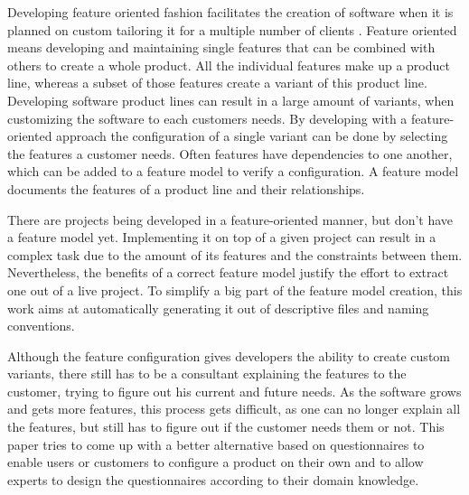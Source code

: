 % 
% 
% 
% 
Developing feature oriented fashion facilitates the creation of software when it is planned on custom tailoring it for a multiple number of clients \cite{spl-pp}. Feature oriented means developing and maintaining single features that can be combined with others to create a whole product. All the individual features make up a product line, whereas a subset of those features create a variant of this product line. Developing software product lines can result in a large amount of variants, when customizing the software to each customers needs. By developing with a feature-oriented approach the configuration of a single variant can be done by selecting the features a customer needs. Often features have dependencies to one another, which can be added to a feature model to verify a configuration. A feature model documents the features of a product line and their relationships\cite{fospl}.

There are projects being developed in a feature-oriented manner, but don't have a feature model yet. Implementing it on top of a given project can result in a complex task due to the amount of its features and the constraints between them. Nevertheless, the benefits of a correct feature model justify the effort to extract one out of a live project. To simplify a big part of the feature model creation, this work aims at automatically generating it out of descriptive files and naming conventions.

Although the feature configuration gives developers the ability to create custom variants, there still has to be a consultant explaining the features to the customer, trying to figure out his current and future needs. As the software grows and gets more features, this process gets difficult, as one can no longer explain all the features, but still has to figure out if the customer needs them or not. This paper tries to come up with a better alternative based on questionnaires to enable users or customers to configure a product on their own and to allow experts to design the questionnaires according to their domain knowledge.

